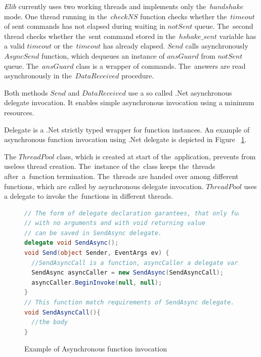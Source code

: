   {\it Elib} currently uses two working threads and implements only the~$handshake$ mode.
  One thread running in the~$checkNS$ function checks whether the~$timeout$ of sent commands
  has not elapsed during waiting in $notSent$ queue. The~second thread checks whether the~sent command
  stored in the~$hshake\_sent$ variable has a valid $timeout$ or the~$timeout$ has already elapsed.
  $Send$ calls asynchronously $AsyncSend$ function, which dequeues an instance of $ansGuard$ from $notSent$ queue.
  The~$ansGuard$ class is a wrapper of commands.
  The~answers are read asynchronously in the~$DataReceived$ procedure.
  \begin{remark}
  Both methods $Send$ and $DataReceived$ use a so called .Net asynchronous
  delegate invocation. It enables simple asynchronous invocation using a minimum resources.
  \end{remark}
  \begin{definition}[Delegate]
  Delegate\cite{delegate} is a .Net strictly typed wrapper for function instances.
  An example of asynchronous function invocation using .Net delegate is depicted in Figure ~\ref{invocation}.
  \end{definition}
  \begin{remark}
  The $ThreadPool$ class, which is created at 
  start of the~application, prevents from useless thread creation. 
  The~instance of the~class keeps the~threads after~a~function termination.
  The~threads are handed over among different functions, which are called 
  by asynchronous delegate invocation.
  $ThreadPool$ uses a delegate to invoke the~functions in different threads.
  \end{remark}
  
\begin{figure}[!hbp]
\begin{lstlisting}[language=cs]
// The form of delegate declaration garantees, that only functions
// with no arguments and with void returning value 
// can be saved in SendAsync delegate.
delegate void SendAsync();
void Send(object Sender, EventArgs ev) {
  //SendAsyncCall is a function, asyncCaller a delegate variable
  SendAsync asyncCaller = new SendAsync(SendAsyncCall);
  asyncCaller.BeginInvoke(null, null);      
}
// This function match requirements of SendAsync delegate.
void SendAsyncCall(){
  //the body
}
\end{lstlisting}
\caption{Example of Asynchronous function invocation}\label{invocation}
\end{figure}

